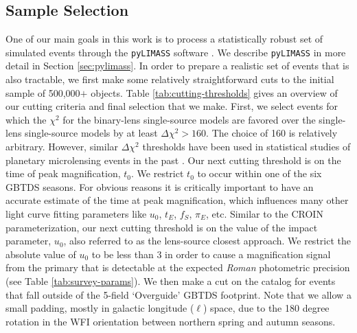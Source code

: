 \documentclass[twocolumn]{aastex631}
\begin{document}
\subsection{Sample Selection} \label{sec:sample_select}
One of our main goals in this work is to process a statistically robust set of simulated events through the \texttt{pyLIMASS} software \citep{bachelet:2024a}. We describe \texttt{pyLIMASS} in more detail in Section \ref{sec:pylimass}. In order to prepare a realistic set of events that is also tractable, we first make some relatively straightforward cuts to the initial sample of 500,000$+$ objects. Table \ref{tab:cutting-thresholds} gives an overview of our cutting criteria and final selection that we make. First, we select events for which the $\chi^2$ for the binary-lens single-source models are favored over the single-lens single-source models by at least $\Delta \chi^2 > 160$. The choice of 160 is relatively arbitrary. However, similar $\Delta \chi^2$ thresholds have been used in statistical studies of planetary microlensing events in the past \citep{suzuki:2016a, suzuki:2018a, koshimoto:2023a, zang:2025a}. Our next cutting threshold is on the time of peak magnification, $t_0$. We restrict $t_0$ to occur within one of the six GBTDS seasons. For obvious reasons it is critically important to have an accurate estimate of the time at peak magnification, which influences many other light curve fitting parameters like $u_0$, $t_E$, $f_S$, $\pi_E$, etc. Similar to the CROIN parameterization, our next cutting threshold is on the value of the impact parameter, $u_0$, also referred to as the lens-source closest approach. We restrict the absolute value of $u_0$ to be less than 3 in order to cause a magnification signal from the primary that is detectable at the expected \textit{Roman} photometric precision (see Table \ref{tab:survey-params}). We then make a cut on the catalog for events that fall outside of the 5-field `Overguide' GBTDS footprint. Note that we allow a small padding, mostly in galactic longitude ($\ell$) space, due to the 180 degree rotation in the WFI orientation between northern spring and autumn seasons.\\
\end{document}
